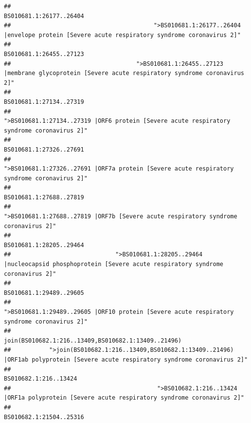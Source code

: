 \documentclass[
]{article}
\begin{document}
\begin{verbatim}
##                                                                                                                BS010681.1:26177..26404 
##                                         ">BS010681.1:26177..26404 |envelope protein [Severe acute respiratory syndrome coronavirus 2]" 
##                                                                                                                BS010681.1:26455..27123 
##                                    ">BS010681.1:26455..27123 |membrane glycoprotein [Severe acute respiratory syndrome coronavirus 2]" 
##                                                                                                                BS010681.1:27134..27319 
##                                             ">BS010681.1:27134..27319 |ORF6 protein [Severe acute respiratory syndrome coronavirus 2]" 
##                                                                                                                BS010681.1:27326..27691 
##                                            ">BS010681.1:27326..27691 |ORF7a protein [Severe acute respiratory syndrome coronavirus 2]" 
##                                                                                                                BS010681.1:27688..27819 
##                                                    ">BS010681.1:27688..27819 |ORF7b [Severe acute respiratory syndrome coronavirus 2]" 
##                                                                                                                BS010681.1:28205..29464 
##                              ">BS010681.1:28205..29464 |nucleocapsid phosphoprotein [Severe acute respiratory syndrome coronavirus 2]" 
##                                                                                                                BS010681.1:29489..29605 
##                                            ">BS010681.1:29489..29605 |ORF10 protein [Severe acute respiratory syndrome coronavirus 2]" 
##                                                                                    join(BS010682.1:216..13409,BS010682.1:13409..21496) 
##           ">join(BS010682.1:216..13409,BS010682.1:13409..21496) |ORF1ab polyprotein [Severe acute respiratory syndrome coronavirus 2]" 
##                                                                                                                  BS010682.1:216..13424 
##                                          ">BS010682.1:216..13424 |ORF1a polyprotein [Severe acute respiratory syndrome coronavirus 2]" 
##                                                                                                                BS010682.1:21504..25316 

\end{verbatim}
\end{document}
